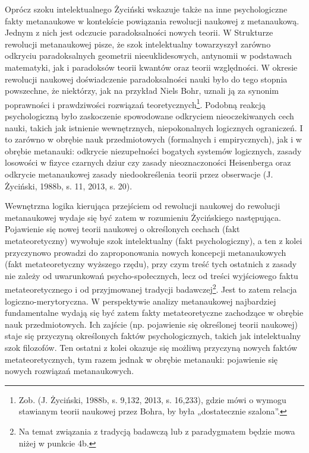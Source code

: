 \documentclass{article}
\begin{document}
Oprócz szoku intelektualnego Życiński wskazuje także na inne psychologiczne fakty metanaukowe w kontekście powiązania
rewolucji naukowej z metanaukową. Jednym z nich jest odczucie paradoksalności nowych teorii. W Strukturze rewolucji
metanaukowej pisze, że szok intelektualny towarzyszył zarówno odkryciu paradoksalnych geometrii nieeuklidesowych,
antynomii w podstawach matematyki, jak i paradoksów teorii kwantów oraz teorii względności. W okresie rewolucji
naukowej doświadczenie paradoksalności nauki było do tego stopnia powszechne, że niektórzy, jak na przykład Niels Bohr,
uznali ją za synonim poprawności i prawdziwości rozwiązań teoretycznych\footnote{Zob. \label{ref:RNDsmv0TXVWdS}(J.
Życiński, 1988b, s. 9,132, 2013, s. 16,233), gdzie mówi o wymogu stawianym teorii naukowej przez Bohra, by była
„dostatecznie szalona”.}. Podobną reakcją psychologiczną było zaskoczenie spowodowane odkryciem nieoczekiwanych cech
nauki, takich jak istnienie wewnętrznych, niepokonalnych logicznych ograniczeń. I to zarówno w obrębie nauk
przedmiotowych (formalnych i empirycznych), jak i w obrębie metanauki: odkrycie niezupełności bogatych systemów
logicznych, zasady losowości w fizyce czarnych dziur czy zasady nieoznaczoności Heisenberga oraz odkrycie metanaukowej
zasady niedookreślenia teorii przez obserwacje \label{ref:RND6Rd4uQGI6n}(J. Życiński, 1988b, s. 11, 2013, s. 20).

Wewnętrzna logika kierująca przejściem od rewolucji naukowej do rewolucji metanaukowej wydaje się być zatem w rozumieniu
Życińskiego następująca. Pojawienie się nowej teorii naukowej o określonych cechach (fakt metateoretyczny) wywołuje
szok intelektualny (fakt psychologiczny), a ten z kolei przyczynowo prowadzi do zaproponowania nowych koncepcji
metanaukowych (fakt metateoretyczny wyższego rzędu), przy czym treść tych ostatnich z zasady nie zależy od uwarunkowań
psycho-społecznych, lecz od treści wyjściowego faktu metateoretycznego i od przyjmowanej tradycji badawczej\footnote{Na
temat związania z tradycją badawczą lub z paradygmatem będzie mowa niżej w punkcie 4b.}. Jest to zatem relacja
logiczno-merytoryczna. W perspektywie analizy metanaukowej najbardziej fundamentalne wydają się być zatem fakty
metateoretyczne zachodzące w obrębie nauk przedmiotowych. Ich zajście (np. pojawienie się określonej teorii naukowej)
staje się przyczyną określonych faktów psychologicznych, takich jak intelektualny szok filozofów. Ten ostatni z kolei
okazuje się możliwą przyczyną nowych faktów metateoretycznych, tym razem jednak w obrębie metanauki: pojawienie się
nowych rozwiązań metanaukowych.
\end{document}
